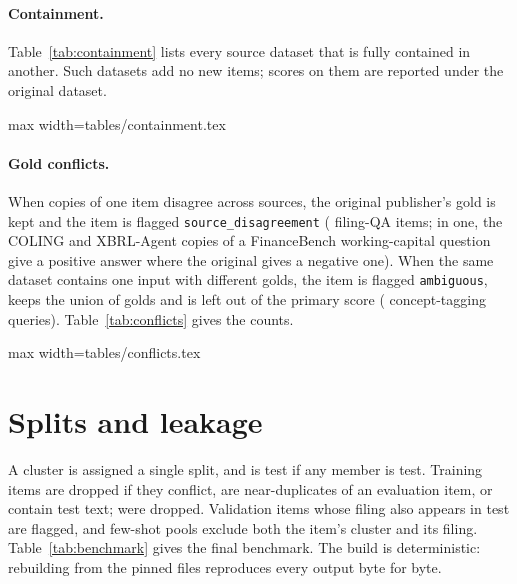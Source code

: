 \documentclass[10pt,twocolumn,a4paper]{article}
\makeatletter
\newcommand{\tabinput}[1]{\@@input #1 }
\makeatother
\begin{document}
\paragraph{Containment.} Table~\ref{tab:containment} lists every source dataset that is fully
contained in another. Such datasets add no new items; scores on them are reported under the
original dataset.

\begin{table}[t]\centering\small
\caption{Datasets fully contained in another (exact or identifier joins).}\label{tab:containment}
\begin{adjustbox}{max width=\columnwidth}\tabinput{tables/containment.tex}\end{adjustbox}
\end{table}

\paragraph{Gold conflicts.} When copies of one item disagree across sources, the original
publisher's gold is kept and the item is flagged \texttt{source\_disagreement} (\nSourceDisagreeQA{}
filing-QA items; in one, the COLING and XBRL-Agent copies of a FinanceBench working-capital question
give a positive answer where the original gives a negative one). When the same dataset contains one input with different golds, the
item is flagged \texttt{ambiguous}, keeps the union of golds and is left out of the primary score
(\nAmbiguousTag{} concept-tagging queries). Table~\ref{tab:conflicts} gives the counts.

\begin{table}[t]\centering\small
\caption{Clusters whose members carry different golds.}\label{tab:conflicts}
\begin{adjustbox}{max width=\columnwidth}\tabinput{tables/conflicts.tex}\end{adjustbox}
\end{table}

\section{Splits and leakage}\label{sec:splits}
A cluster is assigned a single split, and is test if any member is test. Training items are dropped
if they conflict, are near-duplicates of an evaluation item, or contain test text; \nTrainDropped{}
were dropped. Validation items whose filing also appears in test are flagged, and few-shot pools
exclude both the item's cluster and its filing. Table~\ref{tab:benchmark} gives the final
benchmark. The build is deterministic: rebuilding from the pinned files reproduces every output
byte for byte.
\end{document}
